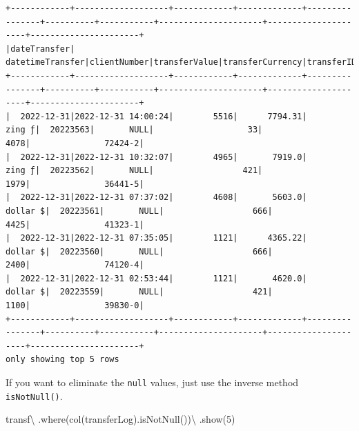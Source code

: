 \documentclass[
  11pt,
  letterpaper,
  DIV=11,
  numbers=noendperiod]{scrreprt}
\newenvironment{Shaded}{\begin{snugshade}}{\end{snugshade}}
\newcommand{\DecValTok}[1]{\textcolor[rgb]{0.68,0.00,0.00}{#1}}
\newcommand{\NormalTok}[1]{\textcolor[rgb]{0.00,0.23,0.31}{#1}}
\newcommand{\OperatorTok}[1]{\textcolor[rgb]{0.37,0.37,0.37}{#1}}
\newcommand{\StringTok}[1]{\textcolor[rgb]{0.13,0.47,0.30}{#1}}
\begin{document}
\begin{verbatim}
+------------+-------------------+------------+-------------+----------------+----------+-----------+---------------------+---------------------+----------------------+
|dateTransfer|   datetimeTransfer|clientNumber|transferValue|transferCurrency|transferID|transferLog|destinationBankNumber|destinationBankBranch|destinationBankAccount|
+------------+-------------------+------------+-------------+----------------+----------+-----------+---------------------+---------------------+----------------------+
|  2022-12-31|2022-12-31 14:00:24|        5516|      7794.31|          zing ƒ|  20223563|       NULL|                   33|                 4078|               72424-2|
|  2022-12-31|2022-12-31 10:32:07|        4965|       7919.0|          zing ƒ|  20223562|       NULL|                  421|                 1979|               36441-5|
|  2022-12-31|2022-12-31 07:37:02|        4608|       5603.0|        dollar $|  20223561|       NULL|                  666|                 4425|               41323-1|
|  2022-12-31|2022-12-31 07:35:05|        1121|      4365.22|        dollar $|  20223560|       NULL|                  666|                 2400|               74120-4|
|  2022-12-31|2022-12-31 02:53:44|        1121|       4620.0|        dollar $|  20223559|       NULL|                  421|                 1100|               39830-0|
+------------+-------------------+------------+-------------+----------------+----------+-----------+---------------------+---------------------+----------------------+
only showing top 5 rows
\end{verbatim}

If you want to eliminate the \texttt{null} values, just use the inverse
method \texttt{isNotNull()}.

\begin{Shaded}
\begin{Highlighting}[]
\NormalTok{transf}\OperatorTok{\textbackslash{}}
\NormalTok{  .where(col(}\StringTok{\textquotesingle{}transferLog\textquotesingle{}}\NormalTok{).isNotNull())}\OperatorTok{\textbackslash{}}
\NormalTok{  .show(}\DecValTok{5}\NormalTok{)}
\end{Highlighting}
\end{Shaded}
\end{document}
